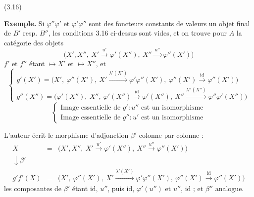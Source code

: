 \documentclass[11pt,a4paper]{article}
\begin{document}
(3.16)



\textbf{Exemple.} Si $\varphi'' \varphi'$ et $\varphi' \varphi''$ sont des
foncteurs constants de valeurs un objet final de $B'$ resp. $B''$, les
conditions 3.16 ci-dessus sont vides, et on trouve pour $A$ la catégorie des
objets
\[
  \bigl( X', X'',\ X' \xrightarrow{\ u'\ } \varphi'(X'') ,\
  X'' \xrightarrow{\ u''\ } \varphi''(X') \bigr)
\]
$f'$ et $f''$ étant $\mapsto X'$ et $\mapsto X''$, et
\[
  \left\{
  \begin{array}{l}
    g'(X') = \bigl( X',\ \varphi''(X'),\
      X' \xrightarrow{\lambda'(X')} \varphi'\varphi''(X') ,\
      \varphi''(X') \xrightarrow{\mathrm{id}} \varphi''(X') \bigr) \\[3pt]
    g''(X'') = \bigl( \varphi'(X''),\ X'',\
      \varphi'(X'') \xrightarrow{\mathrm{id}} \varphi'(X'') ,\
      X'' \xrightarrow{\lambda''(X'')} \varphi''\varphi'(X'') \bigr)
  \end{array}
  \right.
  \tag{3.17}
\]
\[
  \left\{
  \begin{array}{l}
    \text{Image essentielle de } g' : u'' \text{ est un isomorphisme} \\[2pt]
    \text{Image essentielle de } g'' : u' \text{ est un isomorphisme}
  \end{array}
  \right.
  \tag{3.18}
\]

L'auteur écrit le morphisme d'adjonction $\beta'$ colonne par colonne :
\[
  \begin{array}{ccl}
    X & = & \bigl( X', X'',\ X' \xrightarrow{u'} \varphi'(X'') ,\
      X'' \xrightarrow{u''} \varphi''(X') \bigr) \\[4pt]
    \downarrow \beta' & & \\[4pt]
    g' f'(X) & = & \bigl( X',\ \varphi''(X'),\
      X' \xrightarrow{\lambda'(X')} \varphi'\varphi''(X') ,\
      \varphi''(X') \xrightarrow{\mathrm{id}} \varphi''(X') \bigr)
  \end{array}
  \tag{3.20}
\]
les composantes de $\beta'$ étant $\mathrm{id}$, $u''$, puis $\mathrm{id}$,
$\varphi'(u'')$ et $u''$, $\mathrm{id}$ ; et $\beta''$ analogue.
\marginal{adjonction}
\end{document}
